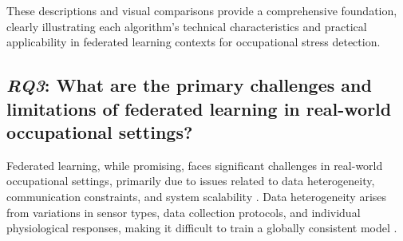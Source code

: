 \documentclass[12pt]{article}
\begin{document}
\begin{table}[htbp]
\centering
\caption{Visual comparison of commonly employed machine learning algorithms in federated learning for occupational stress analysis.}
\label{tab:algorithms_comparison}
\end{table}

These descriptions and visual comparisons provide a comprehensive foundation, clearly illustrating each algorithm's technical characteristics and practical applicability in federated learning contexts for occupational stress detection.

\subsection{\textit{RQ3}: What are the primary challenges and limitations of federated learning in real-world occupational settings?}


Federated learning, while promising, faces significant challenges in real-world occupational settings, primarily due to issues related to data heterogeneity, communication constraints, and system scalability \cite{shiyi_jiang_49d728e9}. Data heterogeneity arises from variations in sensor types, data collection protocols, and individual physiological responses, making it difficult to train a globally consistent model \cite{po_chen_lin_822ae077}. 
\end{document}
